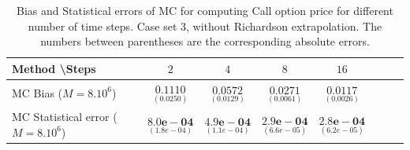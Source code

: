 \documentclass[11pt]{article}
\begin{document}
\begin{table}[h!]
\centering
\begin{tabular}{l*{6}{c}r}
Method \textbackslash  Steps            & $2$ & $4$ & $8$ & $16$  \\
\hline
MC Bias ($M=8.10^6$)   & 	$ \underset{(  0.0250)}{\mathbf{0.1110}}$  & $\underset{(0.0129
	)}{\mathbf{0.0572}}$  & $\underset{(0.0061
	)}{\mathbf{0.0271}}$ & $\underset{(0.0026
	)}{\mathbf{0.0117}}$\\ 

MC Statistical error ($M=8.10^6$)  &  $\underset{(1.8e-04)} {\mathbf{8.0e-04}}$  & $\underset{( 1.1e-04)} {\mathbf{4.9e-04}}$  & $\underset{(  6.6e-05)} {\mathbf{ 2.9e-04}}$ & $\underset{(6.2e-05)} {\mathbf{2.8e-04}}$	\\
\hline
\end{tabular}
\caption{Bias and Statistical errors of MC  for computing Call option price  for different number of time steps. Case set 3, without Richardson extrapolation. The numbers between parentheses are the corresponding absolute errors.}
\label{Bias and Statistical errors of MC ($M=10^6$)  for computing Call option price  for different number of time steps. Case set 3, without Richardson extrapolation. The numbers between parentheses are the corresponding absolute errors.}
\end{table}
\end{document}
